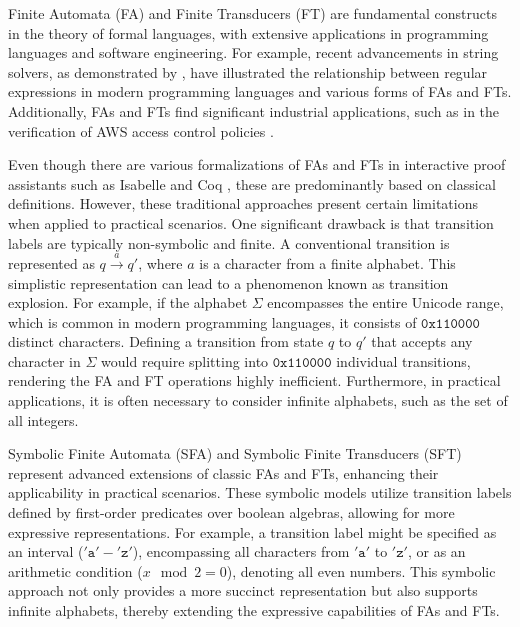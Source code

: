 \documentclass[a4paper,UKenglish,cleveref, autoref, thm-restate]{lipics-v2021}
\begin{document}
Finite Automata (FA) and Finite Transducers (FT) are fundamental constructs in the theory of formal languages, with extensive applications in programming languages and software engineering. For example, recent advancements in string solvers, as demonstrated by \cite{pacmpl/ChenFHHHKLRW22}, have illustrated the relationship between regular expressions in modern programming languages and various forms of FAs and FTs. Additionally, FAs and FTs find significant industrial applications, such as in the verification of AWS access control policies \cite{DBLP:conf/fmcad/BackesBCDGLRTV18}.


Even though there are various formalizations of FAs and FTs in interactive proof assistants such as Isabelle \cite{isabelle-homepage} and Coq \cite{coq-homepage}, these are predominantly based on classical definitions. However, these traditional approaches present certain limitations when applied to practical scenarios. One significant drawback is that transition labels are typically non-symbolic and finite. A conventional transition is represented as $q\xrightarrow{a}q'$, where $a$ is a character from a finite alphabet. This simplistic representation can lead to a phenomenon known as transition explosion. For example, if the alphabet $\Sigma$ encompasses the entire Unicode range, which is common in modern programming languages, it consists of $\texttt{0x110000}$ distinct characters. Defining a transition from state $q$ to $q'$ that accepts any character in $\Sigma$ would require splitting into $\texttt{0x110000}$ individual transitions, rendering the FA and FT operations highly inefficient. Furthermore, in practical applications, it is often necessary to consider infinite alphabets, such as the set of all integers.



Symbolic Finite Automata (SFA) and Symbolic Finite Transducers (SFT) \cite{cav/DAntoniV17, VeanesHLMB12Transducer} represent advanced extensions of classic FAs and  FTs, enhancing their applicability in practical scenarios.
%
These symbolic models utilize transition labels defined by first-order predicates over boolean algebras, allowing for more expressive representations. For example, a transition label might be specified as an interval ($'\texttt{a}'-'\texttt{z}'$), encompassing all characters from $'\texttt{a}'$ to $'\texttt{z}'$, or as an arithmetic condition ($x \mod 2 = 0$), denoting all even numbers. This symbolic approach not only provides a more succinct representation but also supports infinite alphabets, thereby extending the expressive capabilities of FAs and FTs.
\end{document}
